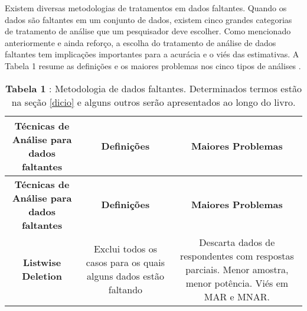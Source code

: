 \documentclass[
]{book}
\begin{document}
Existem diversas metodologias de tratamentos em dados faltantes. Quando os dados são faltantes em um conjunto de dados, existem cinco grandes categorias de tratamento de análise que um pesquisador deve escolher. Como mencionado anteriormente e ainda reforço, a escolha do tratamento de análise de dados faltantes tem implicações importantes para a acurácia e o viés das estimativas. A Tabela 1 resume as definições e os maiores problemas nos cinco tipos de análises \citep{tecnicasinput}.

\begin{longtable}[]{@{}ccc@{}}
\caption{\textbf{Tabela 1} : Metodologia de dados faltantes. Determinados termos estão na seção \ref{dicio} e alguns outros serão apresentados ao longo do livro.}\tabularnewline
\toprule
\begin{minipage}[b]{0.30\columnwidth}\centering
\textbf{Técnicas de Análise para dados faltantes}\strut
\end{minipage} & \begin{minipage}[b]{0.30\columnwidth}\centering
\textbf{Definições}\strut
\end{minipage} & \begin{minipage}[b]{0.30\columnwidth}\centering
\textbf{Maiores Problemas}\strut
\end{minipage}\tabularnewline
\midrule
\endfirsthead
\toprule
\begin{minipage}[b]{0.30\columnwidth}\centering
\textbf{Técnicas de Análise para dados faltantes}\strut
\end{minipage} & \begin{minipage}[b]{0.30\columnwidth}\centering
\textbf{Definições}\strut
\end{minipage} & \begin{minipage}[b]{0.30\columnwidth}\centering
\textbf{Maiores Problemas}\strut
\end{minipage}\tabularnewline
\midrule
\endhead
\begin{minipage}[t]{0.30\columnwidth}\centering
\textbf{Listwise Deletion}\strut
\end{minipage} & \begin{minipage}[t]{0.30\columnwidth}\centering
Exclui todos os casos para os quais alguns dados estão faltando\strut
\end{minipage} & \begin{minipage}[t]{0.30\columnwidth}\centering
Descarta dados de respondentes com respostas parciais. Menor amostra, menor potência. Viés em MAR e MNAR.\strut
\end{minipage}\tabularnewline

\end{longtable}
\end{document}
